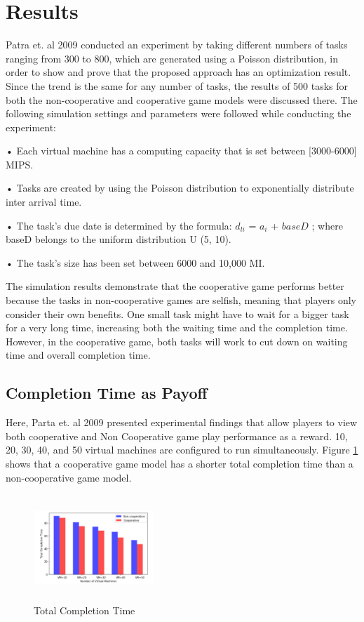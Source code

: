 \documentclass[conference]{IEEEtran}
\begin{document}
\bigskip
\section{\textbf{Results}}
Patra et. al 2009 \cite{patra2019game} conducted an experiment by taking different numbers of tasks ranging from 300 to 800, which are generated using a Poisson distribution, in order to show and prove that the proposed approach has an optimization result. Since the trend is the same for any number of tasks, the results of 500 tasks for both the non-cooperative and cooperative game models were discussed there. The following simulation settings and parameters were followed while conducting the experiment:

• Each virtual machine has a computing capacity that is set between [3000-6000] MIPS.

• Tasks are created by using the Poisson distribution to exponentially distribute inter arrival time.

• The task's due date is determined by the formula: 
$d_{li}$ = $a_{i}$ + $baseD$ ; where baseD belongs to the uniform distribution U (5, 10).

• The task's size has been set between 6000 and 10,000 MI.

The simulation results demonstrate that the cooperative game performs better because the tasks in non-cooperative games are selfish, meaning that players only consider their own benefits. One small task might have to wait for a bigger task for a very long time, increasing both the waiting time and the completion time. However, in the cooperative game, both tasks will work to cut down on waiting time and overall completion time.

\subsection{Completion Time as Payoff}
Here, Parta et. al 2009 presented \cite{patra2019game} experimental findings that allow players to view both cooperative and Non Cooperative game play performance as a reward. 10, 20, 30, 40, and 50 virtual machines are configured to run simultaneously. Figure \ref{Fig 8}  shows that a cooperative game model has a shorter total completion time than a non-cooperative game model.

\begin{figure}[h]
  \centering
  \includegraphics[width=0.4\textwidth, height=4cm]{Figures/Fig 7.png}
  \caption{Total Completion Time \cite{patra2019game}}
  \label{Fig 8}
\end{figure}
\end{document}

